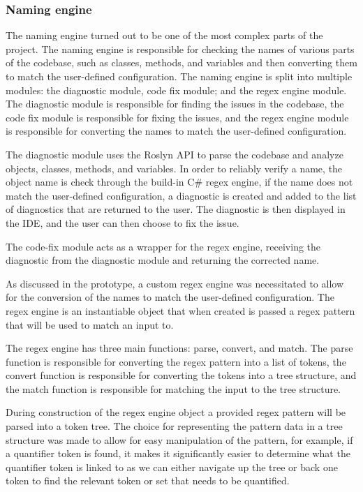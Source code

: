 \subsubsection{Naming engine}

The naming engine turned out to be one of the most complex parts of the project. The naming engine is responsible for checking the names of various parts of the codebase, such as classes, methods, and variables and then converting them to match the user-defined configuration. The naming engine is split into multiple modules: the diagnostic module, code fix module; and the regex engine module. The diagnostic module is responsible for finding the issues in the codebase, the code fix module is responsible for fixing the issues, and the regex engine module is responsible for converting the names to match the user-defined configuration.

The diagnostic module uses the Roslyn API to parse the codebase and analyze objects, classes, methods, and variables. In order to reliably verify a name, the object name is check through the build-in C\# regex engine, if the name does not match the user-defined configuration, a diagnostic is created and added to the list of diagnostics that are returned to the user. The diagnostic is then displayed in the IDE, and the user can then choose to fix the issue.

The code-fix module acts as a wrapper for the regex engine, receiving the diagnostic from the diagnostic module and returning the corrected name.

As discussed in the prototype, a custom regex engine was necessitated to allow for the conversion of the names to match the user-defined configuration. The regex engine is an instantiable object that when created is passed a regex pattern that will be used to match an input to.

The regex engine has three main functions: parse, convert, and match. The parse function is responsible for converting the regex pattern into a list of tokens, the convert function is responsible for converting the tokens into a tree structure, and the match function is responsible for matching the input to the tree structure.

During construction of the regex engine object a provided regex pattern will be parsed into a token tree. The choice for representing the pattern data in a tree structure was made to allow for easy manipulation of the pattern, for example, if a quantifier token is found, it makes it significantly easier to determine what the quantifier token is linked to as we can either navigate up the tree or back one token to find the relevant token or set that needs to be quantified.

